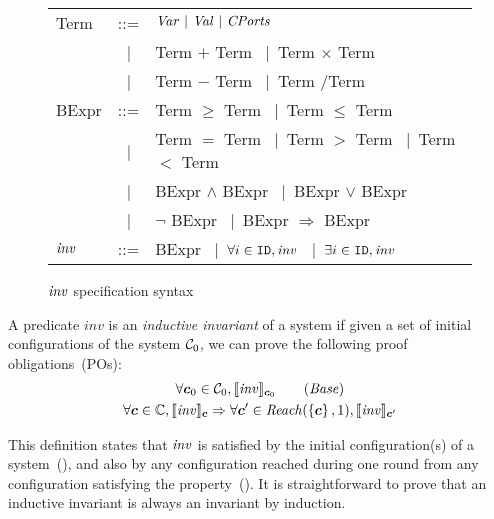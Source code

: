 \begin{figure}
\newcommand{\vbar}{{\normalfont\ |\ }}
\itshape
\begin{tabular}{l@{\ }r@{\ \ }l}
    Term   &   ::= & $\Var \vbar \Val \vbar \Cfield$                                           \\
           & \vbar & Term $+$ Term \vbar Term $\times$ Term                                    \\
           & \vbar & Term $-$ Term \vbar Term \slash Term                                      \\
    BExpr  &   ::= & Term $\geq$ Term \vbar Term $\leq$ Term                                   \\
           & \vbar & Term $=$ Term \vbar Term $>$ Term \vbar Term $<$ Term                     \\
           & \vbar & BExpr $\wedge$ BExpr \vbar BExpr $\vee$ BExpr                             \\
           & \vbar & $\neg$ BExpr \vbar BExpr $\Rightarrow$ BExpr                              \\
    $\mathit{inv}$ &   ::= & BExpr \vbar $\forall i \in \texttt{ID}, \mathit{inv}$ \vbar $\exists i \in \texttt{ID}, \mathit{inv}$
\end{tabular}

\caption{$\mathit{inv}$ specification syntax}\label{fig:inv-syntax}
\end{figure}


\begin{definition}
\label{def:ii}
A predicate $\mathit{inv}$ is an \emph{inductive invariant} of a system if given a set of initial configurations of the system $\mathcal{C}_0$,
we can prove the following proof obligations~(POs):
\begin{gather}
\forall \gconfig_0\in \gset_0, \eec{\Inv}{\gconfig_0} \label{po:base}\tag{\textit{Base}}\\
\forall \gconfig \in \pwg, \eec{\Inv}{\gconfig} \Rightarrow \forall \gconfig' \in \Reach(\left\{\gconfig\right\},1), \eec{\Inv}{\gconfig'} \label{po:ind-hyp-orig}
\end{gather}
\end{definition}
This definition states that $\mathit{inv}$ is satisfied by the initial configuration(s) of a system~(),
and also by any configuration reached during one round from any configuration satisfying the property~().
It is straightforward to prove that an inductive invariant is always an invariant by induction.

